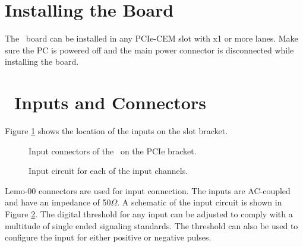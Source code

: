 \section{Installing the Board}
The \deviceName\ board can be installed in any PCIe-CEM slot with x1 or more lanes. 
Make sure the PC is powered off and the main power connector is disconnected while installing the board.\par

%
\section{\deviceName\ Inputs and Connectors}
	Figure \ref{fig:bracket} shows the location of the inputs on the slot bracket.
%
	\begin{figure}[hb]
		\begin{center}
			\caption{Input connectors of the \deviceName\ on the PCIe bracket.\label{fig:bracket}}
		\end{center}
	\end{figure}
	\begin{figure}[hb]
		\begin{center}
			\caption{Input circuit for each of the input channels.\label{fig:inputcirc}}
		\end{center}
	\end{figure}

	Lemo-00 connectors are used for input connection. The inputs are AC-coupled and have an impedance of 50$\Omega$. 
	A schematic of the input circuit is shown in Figure \ref{fig:inputcirc}. 
	The digital threshold for any input can be adjusted to comply with a multitude of single ended signaling standards.
	The threshold can also be used to configure the input for either positive or negative pulses.
	
